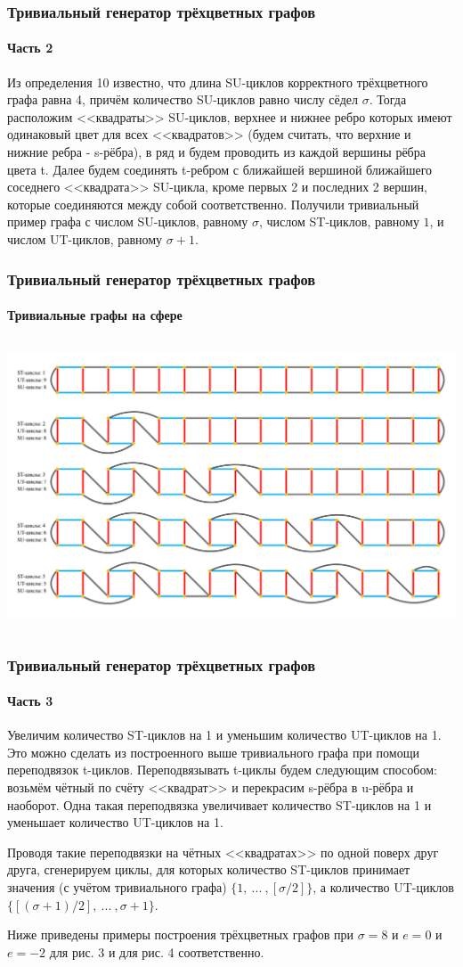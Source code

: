 \documentclass[aspectratio=169]{beamer}
\begin{document}
\begin{frame}
	\frametitle{Тривиальный генератор трёхцветных графов}
	\framesubtitle{Часть 2}
	Из определения 10 известно, что длина SU-циклов корректного трёхцветного графа равна 4, причём количество SU-циклов равно числу сёдел $\sigma$. Тогда расположим <<квадраты>> SU-циклов, верхнее и нижнее ребро которых имеют одинаковый цвет для всех <<квадратов>> (будем считать, что верхние и нижние ребра - s-рёбра), в ряд и будем проводить из каждой вершины рёбра цвета t. Далее будем соединять t-ребром с ближайшей вершиной ближайшего соседнего <<квадрата>> SU-цикла, кроме первых 2 и последних 2 вершин, которые соединяются между собой соответственно. Получили тривиальный пример графа с числом SU-циклов, равному $\sigma$, числом ST-циклов, равному $1$, и числом UT-циклов, равному $\sigma+1$.
\end{frame}
\begin{frame}
	\frametitle{Тривиальный генератор трёхцветных графов}
	\framesubtitle{Тривиальные графы на сфере}
	\begin{columns}
		\includegraphics[width=\columnwidth]{Spheres}
	\end{columns}
\end{frame}
\begin{frame}
	\frametitle{Тривиальный генератор трёхцветных графов}
	\framesubtitle{Часть 3}
	Увеличим количество ST-циклов на 1 и уменьшим количество UT-циклов на 1. Это можно сделать из построенного выше тривиального графа при помощи переподвязок t-циклов. Переподвязывать t-циклы будем следующим способом: возьмём чётный по счёту <<квадрат>> и перекрасим s-рёбра в u-рёбра и наоборот. Одна такая переподвязка увеличивает количество ST-циклов на 1 и уменьшает количество UT-циклов на 1.
	\par Проводя такие переподвязки на чётных <<квадратах>> по одной поверх друг друга, сгенерируем циклы, для которых количество ST-циклов принимает значения (с учётом тривиального графа) $\{1,~...~, [\sigma/2]\}$, а количество UT-циклов $\{[(\sigma + 1)/2],~...~, \sigma+1\}$.
	\par Ниже приведены примеры построения трёхцветных графов при $\sigma=8$ и $e=0$ и $e=-2$ для рис. 3 и для рис. 4 соответственно.
\end{frame}
\end{document}
